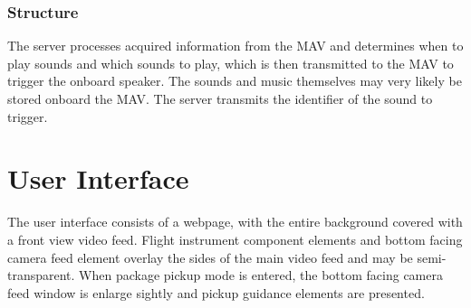 \documentclass[onecolumn, oneside, letterpaper, draftclsnofoot, 10pt, compsoc]{IEEEtran}
\begin{document}
\subsubsection{Structure}
The server processes acquired information from the MAV and determines when to play sounds and which sounds to play, which is then transmitted to the MAV to trigger the onboard speaker. The sounds and music themselves may very likely be stored onboard the MAV. The server transmits the identifier of the sound to trigger.

\section{User Interface}
The user interface consists of a webpage, with the entire background covered with a front view video feed. Flight instrument component elements and bottom facing camera feed element overlay the sides of the main video feed and may be semi-transparent. When package pickup mode is entered, the bottom facing camera feed window is enlarge sightly and pickup guidance elements are presented.

\clearpage
\medskip


\end{document}
